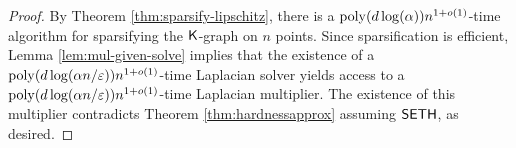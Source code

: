 \begin{proof}
By Theorem \ref{thm:sparsify-lipschitz}, there is a $\mathrm{poly}(d\log(\alpha))n^{1+o(1)}$-time algorithm for sparsifying the $\mathsf{K}$-graph on $n$ points. Since sparsification is efficient, Lemma \ref{lem:mul-given-solve} implies that the existence of a $\mathrm{poly}(d\log(\alpha n/\varepsilon))n^{1+o(1)}$-time Laplacian solver yields access to a $\mathrm{poly}(d\log(\alpha n/\varepsilon))n^{1+o(1)}$-time Laplacian multiplier. The existence of this multiplier contradicts Theorem \ref{thm:hardnessapprox} assuming $\mathsf{SETH}$, as desired.
\end{proof}
